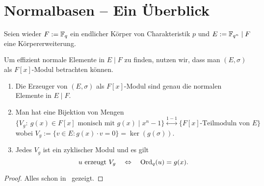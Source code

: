 \chapter{Normalbasen -- Ein Überblick}

Seien wieder $F := \mathbb{F}_q$ ein endlicher Körper von Charakteristik $p$ und 
$E := \mathbb{F}_{q^n} \mid F$ eine Körpererweiterung.

Um effizient normale Elemente in $E\mid F$ zu finden, nutzen wir, dass man
$(E,\sigma)$ als $F[x]$-Modul betrachten können. 

\begin{satz}
  \begin{enumerate}
    \item Die Erzeuger von $(E,\sigma)$ als $F[x]$-Modul sind genau die 
      normalen Elemente in $E\mid F$.
    \item Man hat eine Bijektion von Mengen
      \[ \{V_g :\ g(x) \in F[x] \text{ monisch mit } g(x) \mid x^n-1\}
        \overset{1-1}{\longleftrightarrow}
        \{F[x] \text{-Teilmoduln von }E\}\]
        wobei $V_g := \{v \in E : g(x)\cdot v = 0\} = \ker(g(\sigma))$.
    \item Jedes $V_g$ ist ein zyklischer Modul und es gilt
      \[u \text{ erzeugt } V_g \quad\Leftrightarrow \quad
        \operatorname{Ord}_q(u) = g(x).\]
  \end{enumerate}
\end{satz}
\begin{proof}
  Alles schon in \TODO~gezeigt.
\end{proof}

\begin{beispiel}
  
\end{beispiel}
